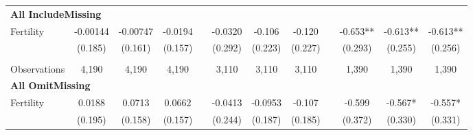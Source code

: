 \begin{landscape}
\begin{table}[htpb!]
\begin{center}
\begin{tabular}{lcccp{2mm}cccp{2mm}ccc}
\multicolumn{12}{l}{\textbf{All IncludeMissing}}\\ 
Fertility&-0.00144&-0.00747&-0.0194&&-0.0320&-0.106&-0.120&&-0.653**&-0.613**&-0.613**\\
&(0.185)&(0.161)&(0.157)&&(0.292)&(0.223)&(0.227)&&(0.293)&(0.255)&(0.256)\\
\begin{footnotesize}\end{footnotesize}&\begin{footnotesize}\end{footnotesize}&\begin{footnotesize}\end{footnotesize}&\begin{footnotesize}\end{footnotesize}&\begin{footnotesize}\end{footnotesize}&\begin{footnotesize}\end{footnotesize}&\begin{footnotesize}\end{footnotesize}&\begin{footnotesize}\end{footnotesize}&\begin{footnotesize}\end{footnotesize}&\begin{footnotesize}\end{footnotesize}&\begin{footnotesize}\end{footnotesize}&\begin{footnotesize}\end{footnotesize}\\Observations&4,190&4,190&4,190&&3,110&3,110&3,110&&1,390&1,390&1,390\\
\multicolumn{12}{l}{\textbf{All OmitMissing}}\\ 
Fertility&0.0188&0.0713&0.0662&&-0.0413&-0.0953&-0.107&&-0.599&-0.567*&-0.557*\\
&(0.195)&(0.158)&(0.157)&&(0.244)&(0.187)&(0.185)&&(0.372)&(0.330)&(0.331)\\

\end{tabular}
\end{center}
\end{table}
\end{landscape}

